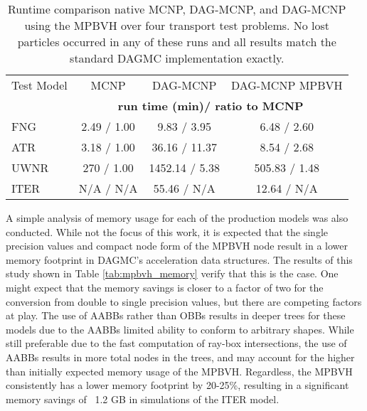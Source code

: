 \begin{table}[H]
  \small
  \begin{center}
    \begin{tabular}{lccc}

      \toprule
      Test Model & MCNP & DAG-MCNP & DAG-MCNP MPBVH \\
      & \multicolumn{3}{c}{\textbf{run time (min)/ ratio to MCNP}} \\
      \hline
      FNG  & 2.49 / 1.00 & 9.83  / 3.95    & 6.48 / 2.60   \\
      ATR  & 3.18 / 1.00 & 36.16 / 11.37   & 8.54 / 2.68   \\
      UWNR & 270  / 1.00 & 1452.14  / 5.38 & 505.83 / 1.48 \\
      ITER & N/A  / N/A  & 55.46   / N/A   & 12.64  / N/A  \\
      \bottomrule
    \end{tabular}
  \end{center}
  \caption[Performance comparison for production DAG-MCNP problems.]{Runtime
    comparison native MCNP, DAG-MCNP, and DAG-MCNP using the MPBVH over four
    transport test problems. No lost particles occurred in any of these runs and
    all results match the standard DAGMC implementation exactly.}
  \label{tab:mpbvh_transport_timing_production}
\end{table}

A simple analysis of memory usage for each of the production models was also
conducted. While not the focus of this work, it is expected that the
single precision values and compact node form of the MPBVH node result in a
lower memory footprint in DAGMC's acceleration data structures. The results of
this study shown in Table \ref{tab:mpbvh_memory} verify that this is the
case. One might expect that the memory savings is closer to a factor of two for
the conversion from double to single precision values, but there are competing
factors at play. The use of AABBs rather than OBBs results in
deeper trees for these models due to the AABBs limited ability to conform to
arbitrary shapes. While still preferable due to the fast computation of ray-box
intersections, the use of AABBs results in more total nodes in the trees, and
may account for the higher than initially expected memory usage of the MPBVH. Regardless,
the MPBVH consistently has a lower memory footprint by 20-25\%, resulting in a
significant memory savings of ~1.2 GB in simulations of the ITER model.

